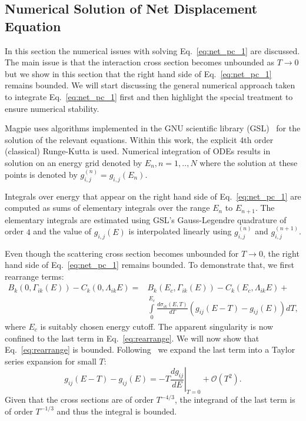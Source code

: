 \documentclass[letterpaper]{mandc2019}
\begin{document}
\subsection{Numerical Solution of Net Displacement Equation}\label{sec:cross_section}
In this section the numerical issues with solving Eq.~\ref{eq:net_pc_1} are discussed. 
The main issue is that the interaction cross section becomes unbounded as $T \rightarrow 0$ but we show in this section that the right hand side of Eq.~\ref{eq:net_pc_1} remains bounded. We will start discussing the general numerical approach taken to integrate Eq.~\ref{eq:net_pc_1} first and then highlight the special treatment to ensure numerical stability.

Magpie uses algorithms implemented in the GNU scientific library (GSL)~\cite{GSL} for the solution of the relevant equations.
Within this work, the explicit 4th order (classical) Runge-Kutta %
is used. Numerical integration of ODEs results in solution on an energy grid denoted by $E_n, n=1,..,N$ where the solution at these points is denoted by $g^{(n)}_{i,j} = g_{i,j}(E_n)$.

Integrals over energy that appear on the right hand side of Eq.~\ref{eq:net_pc_1} are computed as sums of elementary integrals over the range $E_n$ to $E_{n+1}$. The elementary integrals are estimated using GSL's Gauss-Legendre quadrature of order $4$ and the value of $g_{i, j}(E)$ is interpolated linearly using $g^{(n)}_{i,j}$ and $g^{(n+1)}_{i,j}$.

Even though the scattering cross section becomes unbounded for $T \rightarrow 0$, the right hand side of Eq.~\ref{eq:net_pc_1} remains bounded. To demonstrate that, we first rearrange terms:
\begin{align}\label{eq:rearrange}
     B_k(0, \Gamma_{ik}(E)) - C_k(0, \Lambda_{ik} E) = &
     B_k(E_c, \Gamma_{ik}(E)) - C_k(E_c, \Lambda_{ik} E) + \nonumber \\
     &\int\limits_{0}^{E_c} \frac{d \sigma_{ik} (E,T)}{dT} \left( g_{ij}(E-T) - g_{ij}(E) \right) dT,
\end{align}
where $E_c$ is suitably chosen energy cutoff. The apparent singularity is now confined to the last term in Eq.~\ref{eq:rearrange}. 
We will now show that Eq.~\ref{eq:rearrange} is bounded.
Following~\cite{PC1980} we expand the last term into a Taylor series expansion for small $T$:
\begin{equation}\label{eq:taylor}
   g_{ij}(E-T)  - g_{ij}(E) = -T \left . \frac{d g_{ij}}{dE}\right |_{T=0} + \mathcal{O}(T^2).
\end{equation}
Given that the cross sections are of order $T^{-4/3}$, the integrand of the last term is of order $T^{-1/3}$ and thus the integral is bounded.  
\end{document}
